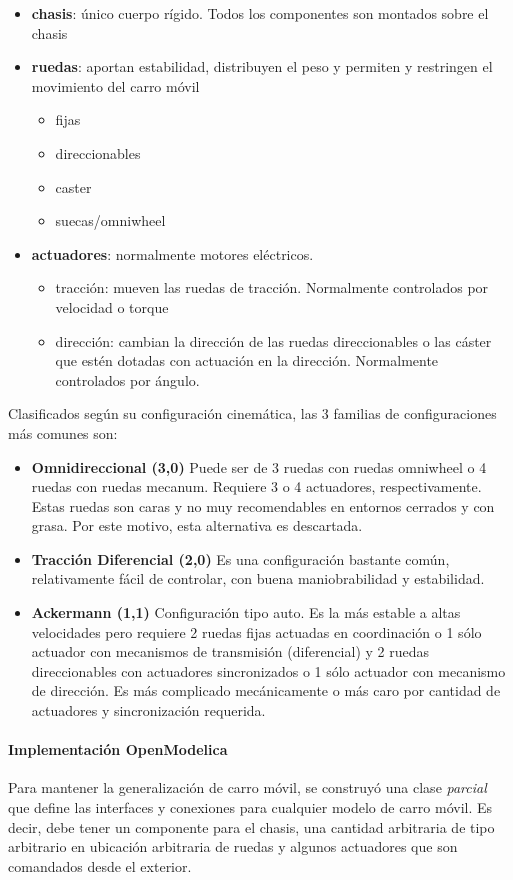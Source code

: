 \begin{itemize}
	\item \textbf{chasis}: único cuerpo rígido. Todos los componentes son montados sobre el chasis
	\item \textbf{ruedas}: aportan estabilidad, distribuyen el peso y permiten y restringen el movimiento del carro móvil
	\begin{itemize}
		\item fijas
		\item direccionables
		\item caster
		\item suecas/omniwheel
	\end{itemize}
	\item \textbf{actuadores}: normalmente motores eléctricos.
	\begin{itemize}
		\item tracción: mueven las ruedas de tracción. Normalmente controlados por velocidad o torque
		\item dirección: cambian la dirección de las ruedas direccionables o las cáster que estén dotadas con actuación en la dirección. Normalmente controlados por ángulo.
	\end{itemize}
\end{itemize}


Clasificados según su configuración cinemática, las 3 familias de configuraciones más comunes son:
\begin{itemize}
	\item \textbf{Omnidireccional (3,0)} Puede ser de 3 ruedas con ruedas omniwheel o 4 ruedas con ruedas mecanum. Requiere 3 o 4 actuadores, respectivamente. Estas ruedas son caras y no muy recomendables en entornos cerrados y con grasa. Por este motivo, esta alternativa es descartada.
	\item \textbf{Tracción Diferencial (2,0)} Es una configuración bastante común, relativamente fácil de controlar, con buena maniobrabilidad y estabilidad. 
	\item \textbf{Ackermann (1,1)} Configuración tipo auto. Es la más estable a altas velocidades pero requiere 2 ruedas fijas actuadas en coordinación o 1 sólo actuador con mecanismos de transmisión (diferencial) y 2 ruedas direccionables con actuadores sincronizados o 1 sólo actuador con mecanismo de dirección. Es más complicado mecánicamente o más caro por cantidad de actuadores y sincronización requerida.
\end{itemize}

\paragraph{Implementación OpenModelica}
Para mantener la generalización de carro móvil, se construyó una clase \emph{parcial} que define las interfaces y conexiones  para cualquier modelo de carro móvil. Es decir, debe tener un componente para el chasis, una cantidad arbitraria de tipo arbitrario en ubicación arbitraria de ruedas y algunos actuadores que son comandados desde el exterior.

